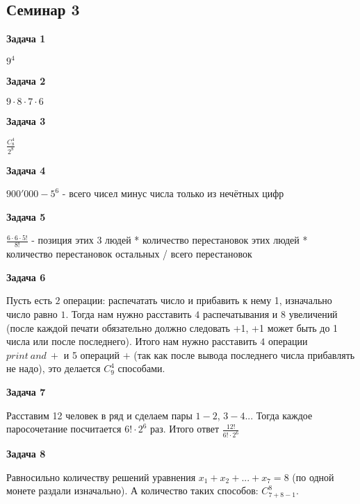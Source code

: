 \subsection{Семинар 3}
\begin{center}
\textbf{Задача 1}
\end{center}
$\displaystyle 9^{4}$

\begin{center}
\textbf{Задача 2}
\end{center}
$\displaystyle 9\cdotp 8\cdotp 7\cdotp 6$

\begin{center}
\textbf{Задача 3}
\end{center}
$\displaystyle \frac{C_{8}^{4}}{2^{8}}$

\begin{center}
\textbf{Задача 4}
\end{center}
$\displaystyle 900'000-5^{6}$ - всего чисел минус числа только из нечётных цифр

\begin{center}
\textbf{Задача 5}
\end{center}
$\displaystyle \frac{6\cdotp 6\cdotp 5!}{8!}$ - позиция этих 3 людей * количество перестановок этих людей * количество перестановок остальных / всего перестановок

\begin{center}
\textbf{Задача 6}
\end{center}
Пусть есть $\displaystyle 2$ операции: распечатать число и прибавить к нему 1, изначально число равно $\displaystyle 1$. Тогда нам нужно расставить $\displaystyle 4$ распечатывания и $\displaystyle 8$ увеличений (после каждой печати обязательно должно следовать +1, +1 может быть до 1 числа или после последнего). Итого нам нужно расставить $\displaystyle 4$ операции $\displaystyle print\ and\ +$ и 5 операций $\displaystyle +$ (так как после вывода последнего числа прибавлять не надо), это делается $\displaystyle C_{9}^{4}$ способами.

\begin{center}
\textbf{Задача 7}
\end{center}
Расставим 12 человек в ряд и сделаем пары $\displaystyle 1-2$, $\displaystyle 3-4$... Тогда каждое паросочетание посчитается $\displaystyle 6!\cdotp 2^{6}$ раз. Итого ответ $\displaystyle \frac{12!}{6!\cdotp 2^{6}}$

\begin{center}
\textbf{Задача 8}
\end{center}
Равносильно количеству решений уравнения $\displaystyle x_{1} +x_{2} +...+x_{7} =8$ (по одной монете раздали изначально). А количество таких способов: $\displaystyle C_{7+8-1}^{8}$.


